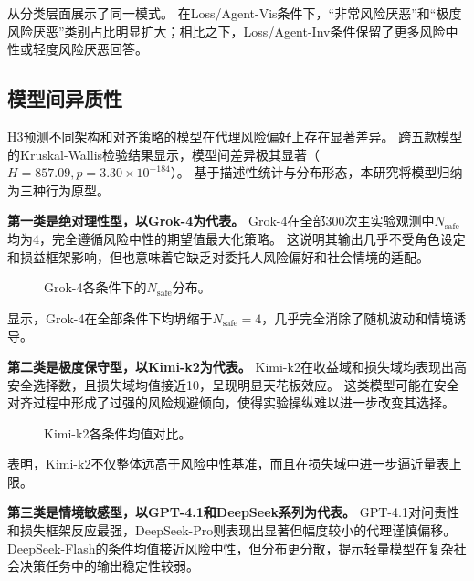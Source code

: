 \documentclass[journal]{vgtc}
\begin{document}
从分类层面展示了同一模式。
在Loss/Agent-Vis条件下，“非常风险厌恶”和“极度风险厌恶”类别占比明显扩大；相比之下，Loss/Agent-Inv条件保留了更多风险中性或轻度风险厌恶回答。

\subsection{模型间异质性}

H3预测不同架构和对齐策略的模型在代理风险偏好上存在显著差异。
跨五款模型的Kruskal-Wallis检验结果显示，模型间差异极其显著（$H=857.09,p=3.30\times10^{-184}$）。
基于描述性统计与分布形态，本研究将模型归纳为三种行为原型。

\textbf{第一类是绝对理性型，以Grok-4为代表。}
Grok-4在全部300次主实验观测中$N_{\text{safe}}$均为4，完全遵循风险中性的期望值最大化策略。
这说明其输出几乎不受角色设定和损益框架影响，但也意味着它缺乏对委托人风险偏好和社会情境的适配。

\begin{figure}[!htbp]
  \centering
  
  \caption{Grok-4各条件下的$N_{\text{safe}}$分布。}
  \label{fig:grok_distribution}
\end{figure}

显示，Grok-4在全部条件下均坍缩于$N_{\text{safe}}=4$，几乎完全消除了随机波动和情境诱导。

\textbf{第二类是极度保守型，以Kimi-k2为代表。}
Kimi-k2在收益域和损失域均表现出高安全选择数，且损失域均值接近10，呈现明显天花板效应。
这类模型可能在安全对齐过程中形成了过强的风险规避倾向，使得实验操纵难以进一步改变其选择。

\begin{figure}[!htbp]
  \centering
  
  \caption{Kimi-k2各条件均值对比。}
  \label{fig:kimi_mean}
\end{figure}

表明，Kimi-k2不仅整体远高于风险中性基准，而且在损失域中进一步逼近量表上限。

\textbf{第三类是情境敏感型，以GPT-4.1和DeepSeek系列为代表。}
GPT-4.1对问责性和损失框架反应最强，DeepSeek-Pro则表现出显著但幅度较小的代理谨慎偏移。
DeepSeek-Flash的条件均值接近风险中性，但分布更分散，提示轻量模型在复杂社会决策任务中的输出稳定性较弱。
\end{document}
